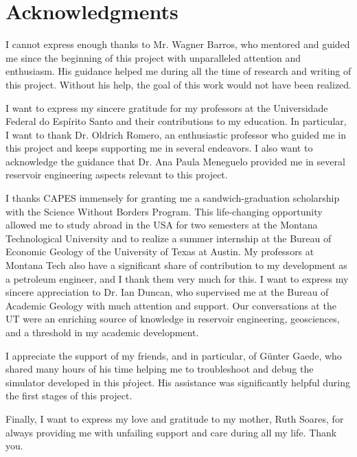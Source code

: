 \newpage
{} %
\thispagestyle{empty}

\chapter*{Acknowledgments}
\thispagestyle{empty}


I cannot express enough thanks to Mr. Wagner Barros, who mentored and guided me since the beginning of this project with unparalleled attention and enthusiasm.
%
His guidance helped me during all the time of research and writing of this project.
%
Without his help, the goal of this work would not have been realized.

I want to express my sincere gratitude for my professors at the Universidade Federal do Esp\'irito Santo and their contributions to my education.
%
In particular, I want to thank Dr. Oldrich Romero, an enthusiastic professor who guided me in this project and keeps supporting me in several endeavors.
%
I also want to acknowledge the guidance that Dr. Ana Paula Meneguelo provided me in several reservoir engineering aspects relevant to this project.

I thanks CAPES immensely for granting me a sandwich-graduation scholarship with the Science Without Borders Program.
%
This life-changing opportunity allowed me to study abroad in the USA for two semesters at the Montana Technological University and to realize a summer internship at the Bureau of Economic Geology of the University of Texas at Austin.
%
My professors at Montana Tech also have a significant share of contribution to my development as a petroleum engineer, and I thank them very much for this.
%
I want to express my sincere appreciation to Dr. Ian Duncan, who supervised me at the Bureau of Academic Geology with much attention and support. Our conversations at the UT were an enriching source of knowledge in reservoir engineering, geosciences, and a threshold in my academic development.


I appreciate the support of my friends, and in particular, of G\"unter Gaede, who shared many hours of his time helping me to troubleshoot and debug the simulator developed in this pŕoject.
%
His assistance was significantly helpful during the first stages of this project.


Finally, I want to express my love and gratitude to my mother, Ruth Soares, for always providing me with unfailing support and care during all my life. Thank you.